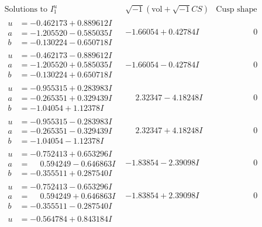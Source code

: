 \documentclass[1p]{elsarticle_modified}
\theoremstyle{definition}
\newcommand{\I}{\sqrt{-1}}
\begin{document}
$$\begin{array}{c|c|c}  
\text{Solutions to }I^u_{1}& \I (\text{vol} + \sqrt{-1}CS) & \text{Cusp shape}\\
 \hline 
\begin{aligned}
u &= -0.462173 + 0.889612 I \\
a &= -1.205520 - 0.585035 I \\
b &= -0.130224 - 0.650718 I\end{aligned}
 & -1.66054 + 0.42784 I & \phantom{-0.000000 } 0 \\ \hline\begin{aligned}
u &= -0.462173 - 0.889612 I \\
a &= -1.205520 + 0.585035 I \\
b &= -0.130224 + 0.650718 I\end{aligned}
 & -1.66054 - 0.42784 I & \phantom{-0.000000 } 0 \\ \hline\begin{aligned}
u &= -0.955315 + 0.283983 I \\
a &= -0.265351 + 0.329439 I \\
b &= -1.04054 + 1.12378 I\end{aligned}
 & \phantom{-}2.32347 - 4.18248 I & \phantom{-0.000000 } 0 \\ \hline\begin{aligned}
u &= -0.955315 - 0.283983 I \\
a &= -0.265351 - 0.329439 I \\
b &= -1.04054 - 1.12378 I\end{aligned}
 & \phantom{-}2.32347 + 4.18248 I & \phantom{-0.000000 } 0 \\ \hline\begin{aligned}
u &= -0.752413 + 0.653296 I \\
a &= \phantom{-}0.594249 - 0.646863 I \\
b &= -0.355511 + 0.287540 I\end{aligned}
 & -1.83854 - 2.39098 I & \phantom{-0.000000 } 0 \\ \hline\begin{aligned}
u &= -0.752413 - 0.653296 I \\
a &= \phantom{-}0.594249 + 0.646863 I \\
b &= -0.355511 - 0.287540 I\end{aligned}
 & -1.83854 + 2.39098 I & \phantom{-0.000000 } 0 \\ \hline\begin{aligned}
u &= -0.564784 + 0.843184 I \\

\end{aligned}
\end{array}$$
\end{document}
